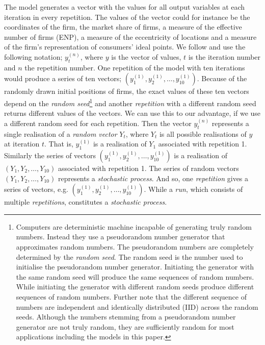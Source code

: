 \documentclass[preprint, 12pt]{elsarticle}
\begin{document}
The model generates a vector with the values for all output variables at each iteration in every repetition. The values of the vector could for instance be the coordinates of the firm, the market share of firms, a measure of the effective number of firms (ENP), a measure of the eccentricity of locations and a measure of the firm's representation of consumers' ideal points. We follow \citet{Laver_Sergenti_2011} and use the following notation; $y_t^{(n)}$, where $y$ is the vector of values, $t$ is the iteration number and $n$ the repetition number. One repetition of the model with ten iterations would produce a series of ten vectors; $( y_1^{(1)}, y_2^{(1)}, \dots, y_{10}^{(1)} )$. Because of the randomly drawn initial positions of firms, the exact values of these ten vectors depend on the \emph{random seed}\footnote{Computers are deterministic machine incapable of generating truly random numbers. Instead they use a pseudorandom number generator that approximates random numbers. The pseudorandom numbers are completely determined by the \emph{random seed}. The random seed is the number used to initialise the pseudorandom number generator. Initiating the generator with the same random seed will produce the same sequences of random numbers. While initiating the generator with different random seeds produce different sequences of random numbers. Further note that the different sequence of numbers are independent and identically distributed (IID) across the random seeds. Although the numbers stemming from a pseudorandom number generator are not truly random, they are sufficiently random for most applications including the models in this paper.} and another \emph{repetition} with a different random seed returns different values of the vectors. We can use this to our advantage, if we use a different random seed for each repetition. Then the vector $y_t^{(n)}$ represents a single realisation of a \emph{random vector} $Y_t$, where $Y_t$ is all possible realisations of $y$ at iteration $t$. That is, $y_1^{(1)}$ is a realisation of $Y_1$ associated with repetition 1. Similarly the series of vectors $( y_1^{(1)}, y_2^{(1)}, \dots, y_{10}^{(1)} )$ is a realisation of $( Y_1, Y_2, \dots, Y_{10} )$ associated with repetition 1. The series of random vectors $( Y_1, Y_2, \dots, Y_{10} )$ represents a \emph{stochastic process}. And so, one \emph{repetition} gives a series of vectors, e.g. $( y_1^{(1)}, y_2^{(1)}, \dots, y_{10}^{(1)} )$. While a \emph{run}, which consists of multiple \emph{repetitions}, constitutes a \emph{stochastic process}.
\end{document}
